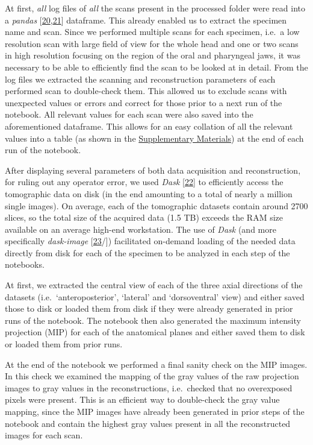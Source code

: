 At first, \emph{all} log files of \emph{all} the scans present in the processed folder were read into a \emph{pandas} {[}\protect\hyperlink{ref-19qQOHlFN}{20},\protect\hyperlink{ref-U5AcoDOX}{21}{]} dataframe.
This already enabled us to extract the specimen name and scan.
Since we performed multiple scans for each specimen, i.e.~a low resolution scan with large field of view for the whole head and one or two scans in high resolution focusing on the region of the oral and pharyngeal jaws, it was necessary to be able to efficiently find the scan to be looked at in detail.
From the log files we extracted the scanning and reconstruction parameters of each performed scan to double-check them.
This allowed us to exclude scans with unexpected values or errors and correct for those prior to a next run of the notebook.
All relevant values for each scan were also saved into the aforementioned dataframe.
This allows for an easy collation of all the relevant values into a table (as shown in the \protect\hyperlink{supplementary-materials}{Supplementary Materials}) at the end of each run of the notebook.

After displaying several parameters of both data acquisition and reconstruction, for ruling out any operator error, we used \emph{Dask} {[}\protect\hyperlink{ref-hj1CnyWB}{22}{]} to efficiently access the tomographic data on disk (in the end amounting to a total of nearly a million single images).
On average, each of the tomographic datasets contain around 2700 slices, so the total size of the acquired data (1.5 TB) exceeds the RAM size available on an average high-end workstation.
The use of \emph{Dask} (and more specifically \emph{dask-image} {[}\protect\hyperlink{ref-wIfTDBqd}{23}/{]}) facilitated on-demand loading of the needed data directly from disk for each of the specimen to be analyzed in each step of the notebooks.

At first, we extracted the central view of each of the three axial directions of the datasets (i.e.~`anteroposterior', `lateral' and `dorsoventral' view) and either saved those to disk or loaded them from disk if they were already generated in prior runs of the notebook.
The notebook then also generated the maximum intensity projection (MIP) for each of the anatomical planes and either saved them to disk or loaded them from prior runs.

At the end of the notebook we performed a final sanity check on the MIP images.
In this check we examined the mapping of the gray values of the raw projection images to gray values in the reconstructions, i.e.~checked that no overexposed pixels were present.
This is an efficient way to double-check the gray value mapping, since the MIP images have already been generated in prior steps of the notebook and contain the highest gray values present in all the reconstructed images for each scan.

